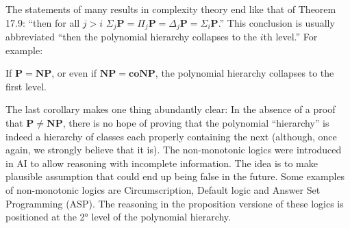 The statements of many results in complexity theory end like that of Theorem 17.9: ``then for all $j > i$ $\Sigma_j\mathbf{P} = \Pi_j\mathbf{P} = \Delta_j\mathbf{P} = \Sigma_i\mathbf{P}$.'' This conclusion is usually abbreviated ``then the polynomial hierarchy collapses to the $i$th level.'' For example:

\begin{defbox}[Corollary]
If $\mathbf{P} = \mathbf{NP}$, or even if $\mathbf{NP} = \mathbf{coNP}$, the polynomial hierarchy collapses to the first level.
\end{defbox}
The last corollary makes one thing abundantly clear: In the absence of a proof that $\mathbf{P} \neq \mathbf{NP}$, there is no hope of proving that the polynomial ``hierarchy'' is indeed a hierarchy of classes each properly containing the next (although, once again, we strongly believe that it is).
The non-monotonic logics were introduced in AI to allow reasoning with incomplete information. The idea is to make plausible assumption that could end up being false in the future. Some examples of non-monotonic logics are Circumscription, Default logic and Answer Set Programming (ASP). The reasoning in the proposition versione of these logics is positioned at the 2° level of the polynomial hierarchy. 